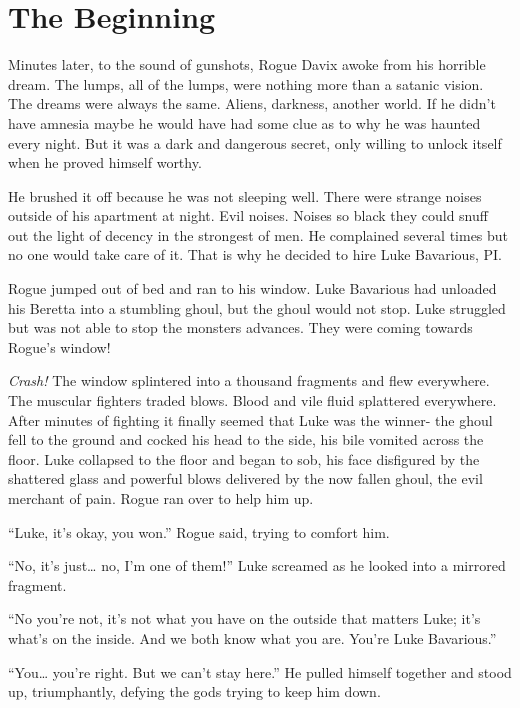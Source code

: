 \chapter{The Beginning}


Minutes later, to the sound of gunshots, Rogue Davix aw\-oke from his
horrible dream. The lumps, all of the lumps, were nothing more than
a satanic vision. The dreams were always the same. Aliens,
darkness, another world. If he didn't have amnesia maybe he
would have had some clue as to why he was haunted every night. But
it was a dark and dangerous secret, only willing to unlock itself
when he proved himself worthy.



He brushed it off because he was not sleeping well. There were
strange noises outside of his apartment at night. Evil noises.
Noises so black they could snuff out the light of decency in the
strongest of men. He complained several times but no one would take
care of it. That is why he decided to hire Luke Bavarious,
PI.



Rogue jumped out of bed and ran to his window. Luke Bavarious had
unloaded his Beretta into a stumbling ghoul, but the ghoul would
not stop. Luke struggled but was not able to stop the monsters
advances. They were coming towards Rogue's window!



{\em Crash!} The window splintered into a thousand fragments and
flew everywhere. The muscular fighters traded blows. Blood and vile
fluid splattered everywhere. After minutes of fighting it finally
seemed that Luke was the winner- the ghoul fell to the ground and
cocked his head to the side, his bile vomited across the floor.
Luke collapsed to the floor and began to sob, his face disfigured
by the shattered glass and powerful blows delivered by the now
fallen ghoul, the evil merchant of pain. Rogue ran over to help him
up.



``Luke, it's okay, you won.'' Rogue said, trying to
comfort him.

``No, it's just{\ldots} no, I'm one of
them!'' Luke screamed as he looked into a mirrored
fragment.

``No you're not, it's not what you have on the
outside that matters Luke; it's what's on the inside.
And we both know what you are. You're Luke
Bavarious.''

``You{\ldots} you're right. But we can't stay
here.'' He pulled himself together and stood up, triumphantly,
defying the gods trying to keep him down.



